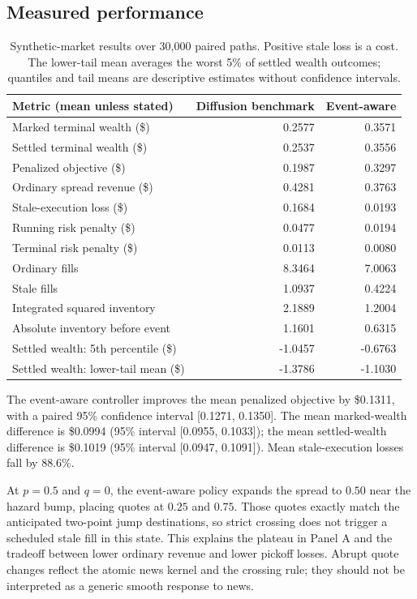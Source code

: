 \subsection{Measured performance}
\begin{table}[htbp]
\centering\small
\begin{tabular}{lrr}
\toprule
Metric (mean unless stated) & Diffusion benchmark & Event-aware\\
\midrule
Marked terminal wealth (\$) & 0.2577 & 0.3571 \\
Settled terminal wealth (\$) & 0.2537 & 0.3556 \\
Penalized objective (\$) & 0.1987 & 0.3297 \\
Ordinary spread revenue (\$) & 0.4281 & 0.3763 \\
Stale-execution loss (\$) & 0.1684 & 0.0193 \\
Running risk penalty (\$) & 0.0477 & 0.0194 \\
Terminal risk penalty (\$) & 0.0113 & 0.0080 \\
Ordinary fills & 8.3464 & 7.0063 \\
Stale fills & 1.0937 & 0.4224 \\
Integrated squared inventory & 2.1889 & 1.2004 \\
Absolute inventory before event & 1.1601 & 0.6315 \\
Settled wealth: 5th percentile (\$) & -1.0457 & -0.6763 \\
Settled wealth: lower-tail mean (\$) & -1.3786 & -1.1030 \\
\bottomrule
\end{tabular}
\caption{Synthetic-market results over 30,000 paired paths. Positive stale loss
is a cost. The lower-tail mean averages the worst 5\% of settled wealth outcomes;
quantiles and tail means are descriptive estimates without confidence intervals.}
\label{tab:mc}
\end{table}

The event-aware controller improves the mean penalized objective by \$0.1311,
with a paired 95\% confidence interval [0.1271, 0.1350]. The mean marked-wealth
difference is \$0.0994 (95\% interval
[0.0955, 0.1033]); the mean settled-wealth difference is
\$0.1019 (95\% interval [0.0947, 0.1091]).
Mean stale-execution losses fall by 88.6\%.

At $p=0.5$ and $q=0$, the event-aware policy expands the spread to $0.50$
near the hazard bump, placing quotes at $0.25$ and $0.75$. Those quotes exactly
match the anticipated two-point jump destinations, so strict crossing does not
trigger a scheduled stale fill in this state. This explains the plateau in
Panel A and the tradeoff between lower ordinary revenue and lower pickoff
losses. Abrupt quote changes reflect the atomic news kernel and the crossing
rule; they should not be interpreted as a generic smooth response to news.

